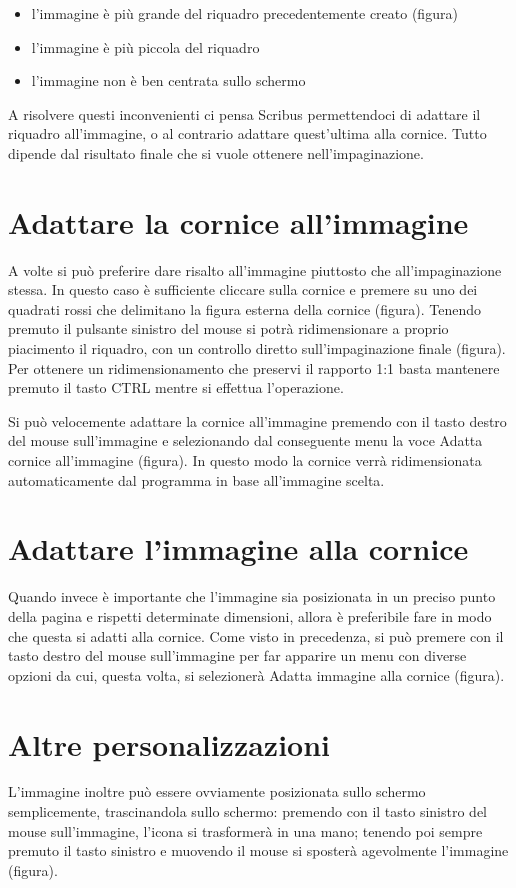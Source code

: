 \documentclass[a4paper, 12pt]{book}
\begin{document}
\begin{itemize}
	\item l'immagine è più grande del riquadro precedentemente creato (figura)
	
	\item l'immagine è più piccola del riquadro

	\item l'immagine non è ben centrata sullo schermo
\end{itemize}

A risolvere questi inconvenienti ci pensa Scribus permettendoci di adattare il riquadro all'immagine, o al contrario adattare quest'ultima alla cornice. Tutto dipende dal risultato finale che si vuole ottenere nell'impaginazione.

\section{Adattare la cornice all'immagine}
A volte si può preferire dare risalto all'immagine piuttosto che all'impaginazione stessa. In questo caso è sufficiente cliccare sulla cornice e premere su uno dei quadrati rossi che delimitano la figura esterna della cornice (figura). Tenendo premuto il pulsante sinistro del mouse si potrà ridimensionare a proprio piacimento il riquadro, con un controllo diretto sull'impaginazione finale (figura). Per ottenere un ridimensionamento che preservi il rapporto 1:1 basta mantenere premuto il tasto CTRL mentre si effettua l'operazione.

Si può velocemente adattare la cornice all'immagine premendo con il tasto destro del mouse sull'immagine e selezionando dal conseguente menu la voce Adatta cornice all'immagine (figura). In questo modo la cornice verrà ridimensionata automaticamente dal programma in base all'immagine scelta.

\section{Adattare l'immagine alla cornice}
Quando invece è importante che l'immagine sia posizionata in un preciso punto della pagina e rispetti determinate dimensioni, allora è preferibile fare in modo che questa si adatti alla cornice. Come visto in precedenza, si può premere con il tasto destro del mouse sull'immagine per far apparire un menu con diverse opzioni da cui, questa volta, si selezionerà Adatta immagine alla cornice (figura).

\section{Altre personalizzazioni}
L'immagine inoltre può essere ovviamente posizionata sullo schermo semplicemente, trascinandola sullo schermo: premendo con il tasto sinistro del mouse sull'immagine, l'icona si trasformerà in una mano; tenendo poi sempre premuto il tasto sinistro e muovendo il mouse si sposterà agevolmente l'immagine (figura).
\end{document}

